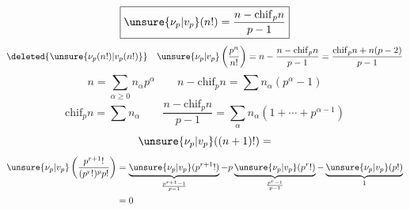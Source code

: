 \[
\boxed{\unsure{\nu_p|v_p}(n!)=\frac{n-\mathrm{chif}_p n}{p-1}}
\]
\[
\deleted{\unsure{\nu_p(n!)|v_p(n!)}}\quad \unsure{\nu_p|v_p}\left(\frac{p^n}{n!}\right)=n-\frac{n-\mathrm{chif}_p n}{p-1}=\frac{\mathrm{chif}_p n+n(p-2)}{p-1}
\]
\[
n=\sum_{\alpha\geq0}n_\alpha p^\alpha\qquad n-\mathrm{chif}_p n=\sum n_\alpha(p^\alpha-1)
\]
\[
\mathrm{chif}_p n=\sum n_\alpha\qquad\frac{n-\mathrm{chif}_p n}{p-1}=\sum_\alpha n_\alpha(1+\cdots+p^{\alpha-1})
\]
\[
\unsure{\nu_p|v_p}((n+1)!)=
\]
\[
\begin{aligned}
\unsure{\nu_p|v_p}\left(\frac{p^{r+1}!}{(p^r!)^p p!}\right)
&=\underbrace{\unsure{\nu_p|v_p}(p^{r+1}!)}_{\frac{p^{r+1}-1}{p-1}}
-p\underbrace{\unsure{\nu_p|v_p}(p^r!)}_{\frac{p^r-1}{p-1}}
-\underbrace{\unsure{\nu_p|v_p}(p!)}_{1}\\
&=0
\end{aligned}
\]
